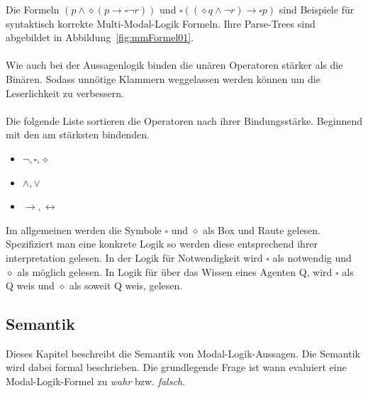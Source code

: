 Die Formeln $(p \wedge \diamond(p \rightarrow \square \neg r))$ und 
$\square((\diamond q \wedge \neg r) \rightarrow \square p )$ sind Beispiele für syntaktisch korrekte Multi-Modal-Logik Formeln. Ihre Parse-Trees sind abgebildet in Abbildung~\ref{fig:mmFormel01}.\\
\\
Wie auch bei der Aussagenlogik binden die unären Operatoren stärker als die Binären.
Sodass unnötige Klammern weggelassen werden können um die Leserlichkeit zu verbessern.\\
\\
Die folgende Liste sortieren die Operatoren nach ihrer Bindungsstärke. Beginnend mit den am stärksten bindenden.\\
\begin{itemize}
	\item $\neg, \square, \diamond$
	\item $\wedge, \vee$
	\item $\rightarrow, \leftrightarrow$
\end{itemize}

Im allgemeinen werden die Symbole $\square$ und $\diamond$ als Box und Raute gelesen. 
Spezifiziert man eine konkrete Logik so werden diese entsprechend ihrer interpretation gelesen. In der Logik für Notwendigkeit wird $\square$ als notwendig und $\diamond$ als möglich gelesen. In Logik für über das Wissen eines Agenten Q, wird $\square$ als Q weis und $\diamond$ als soweit Q weis, gelesen.



\subsection{Semantik} %
\label{sec:semantik}

Dieses Kapitel beschreibt die Semantik von Modal-Logik-Aussagen. 
Die Semantik wird dabei formal beschrieben. Die grundlegende Frage ist wann evaluiert eine Modal-Logik-Formel zu \emph{wahr} bzw. \emph{falsch}.

